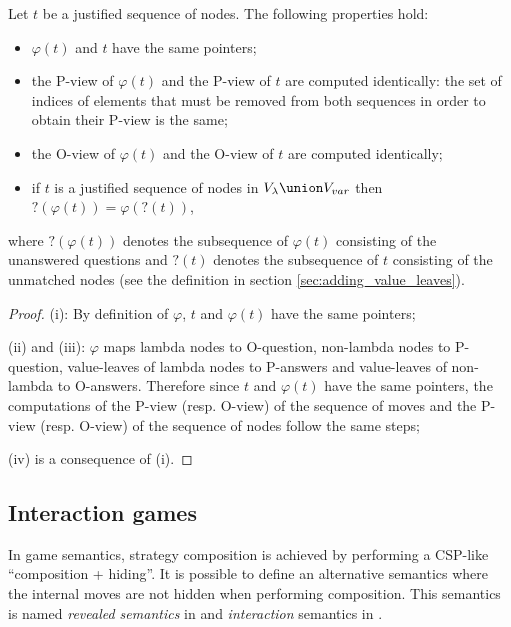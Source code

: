 \begin{property}
\label{proper:phi_pview} Let $t$ be a justified sequence of nodes. The following properties hold:
\begin{itemize}
\item[(i)] $\varphi(t)$ and $t$ have the same pointers;
\item[(ii)] the P-view of $\varphi(t)$ and the P-view of $t$ are computed
identically: the set of indices of elements that must be removed
from both sequences in order to obtain their P-view is the same;
\item[(iii)] the O-view of $\varphi(t)$ and the O-view of $t$ are computed identically;
\item[(iv)] if $t$ is a justified sequence of nodes in $V_\lambda \union V_{var}$ then $?(\varphi(t)) =
\varphi(?(t))$,
\end{itemize}
where $?(\varphi(t))$ denotes the subsequence of $\varphi(t)$ consisting of the unanswered questions
and $?(t)$ denotes the subsequence of $t$ consisting of the unmatched nodes (see the
definition in section \ref{sec:adding_value_leaves}).
\end{property}
\begin{proof}
(i): By definition of $\varphi$, $t$ and $\varphi(t)$ have the same
pointers;

(ii) and (iii): $\varphi$ maps lambda nodes to O-question,
non-lambda nodes to P-question, value-leaves of lambda nodes to P-answers and
value-leaves of non-lambda to O-answers. Therefore since $t$ and $\varphi(t)$ have the
same pointers, the computations of the P-view (resp. O-view) of the
sequence of moves and the P-view (resp. O-view) of the sequence of
nodes follow the same steps;

(iv) is a consequence of (i).

\end{proof}


\subsection{Interaction games}
\label{sec:interaction_semantics}

In game semantics, strategy composition is achieved by performing a
CSP-like ``composition + hiding''. It is possible to define an
alternative semantics where the internal moves are not hidden when
performing composition. This semantics is named \emph{revealed semantics} in \cite{willgreenlandthesis} and \emph{interaction}
semantics in \cite{DBLP:conf/sas/DimovskiGL05}.

